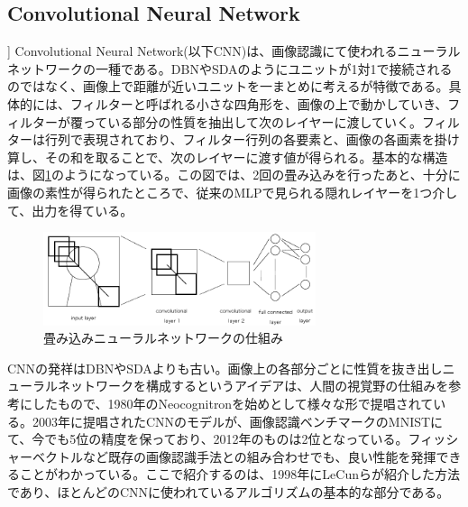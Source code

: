 \subsection{Convolutional Neural Network}
\label{subsec:c3_cnn}]
Convolutional Neural Network(以下CNN)は、画像認識にて使われるニューラルネットワークの一種である。DBNやSDAのようにユニットが1対1で接続されるのではなく、画像上で距離が近いユニットを一まとめに考えるが特徴である。具体的には、フィルターと呼ばれる小さな四角形を、画像の上で動かしていき、フィルターが覆っている部分の性質を抽出して次のレイヤーに渡していく。フィルターは行列で表現されており、フィルター行列の各要素と、画像の各画素を掛け算し、その和を取ることで、次のレイヤーに渡す値が得られる。基本的な構造は、図\ref{c3_convolution}のようになっている。この図では、2回の畳み込みを行ったあと、十分に画像の素性が得られたところで、従来のMLPで見られる隠れレイヤーを1つ介して、出力を得ている。\par
\begin{figure}[tbp]
 \centering
  \includegraphics[width=80mm]{img/c3/convolution}
 \caption{畳み込みニューラルネットワークの仕組み}
 \label{c3_convolution}
\end{figure}
CNNの発祥はDBNやSDAよりも古い。画像上の各部分ごとに性質を抜き出しニューラルネットワークを構成するというアイデアは、人間の視覚野の仕組みを参考にしたもので、1980年のNeocognitronを始めとして\cite{fukushima1980neocognitron}\cite{fukushima1983neocognitron}様々な形で提唱されている\cite{lecun1998gradient-based}\cite{serre2007robust}。2003年に提唱されたCNNのモデルが、画像認識ベンチマークのMNISTにて、今でも5位の精度を保っており\cite{simard2003best}、2012年のものは2位となっている\cite{ciresan2012multi-column}。フィッシャーベクトルなど既存の画像認識手法との組み合わせでも、良い性能を発揮できることがわかっている\cite{nakayama2013efficient}。ここで紹介するのは、1998年にLeCunらが紹介した方法\cite{lecun1998gradient-based}であり、ほとんどのCNNに使われているアルゴリズムの基本的な部分である。
